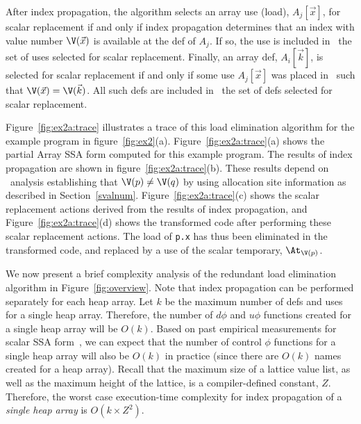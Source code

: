 
After index propagation, the algorithm selects an array use (load),
$A_j[\vec{x}]$, for scalar replacement if and only if index propagation
determines that an index with value number $\V(\vec{x})$ is available at the 
def of $A_j$.
If so, the use is included in  \URS\, the set of uses selected
for scalar replacement.
Finally, an array def, $A_i[\vec{k}]$, is selected for
scalar replacement if and only if some use $A_j[\vec{x}]$ was placed in \URS\ such
that  $\V(\vec{x})=\V(\vec{k})$.  
All such defs are included in \DRS\, the set of defs selected for scalar
replacement.



Figure~\ref{fig:ex2a:trace} illustrates a trace of this load
elimination algorithm for the example program in
figure~\ref{fig:ex2}(a).  Figure~\ref{fig:ex2a:trace}(a) shows the
partial Array SSA form computed for this example program.  The results
of index propagation are shown in figure~\ref{fig:ex2a:trace}(b).
These results depend on \dd\ analysis establishing that $\V(p) \not=
\V(q)$ by using allocation site information as described in
Section~\ref{svalnum}.
Figure~\ref{fig:ex2a:trace}(c) shows the scalar replacement actions
derived from the results of index propagation, and
Figure~\ref{fig:ex2a:trace}(d) shows the transformed code after
performing these scalar replacement actions.  The load of {\tt p.x}
has thus
been eliminated in the transformed code, and replaced by a use
of the scalar temporary, $\At_{\V(p)}$.

We now present a brief complexity analysis of the
redundant load elimination algorithm in Figure~\ref{fig:overview}.
Note that index propagation can be performed separately for each heap
array.  Let $k$ be the maximum number of defs and uses for a single
heap array.  Therefore, the number of $d\phi$ and $u\phi$ functions
created for a single heap array will be $O(k)$.  Based on past
empirical measurements for scalar SSA form~\cite{CFRWZ91a}, we can
expect that the number of control $\phi$ functions for a single heap
array will also be $O(k)$ in practice (since there are $O(k)$ names
created for a heap array).  Recall that the maximum size of
a lattice value list, as well as the maximum height of the lattice, is
a compiler-defined constant, $Z$.  Therefore, the worst case
execution-time complexity for index propagation of a {\it single heap
array} is $O(k \times Z^2)$.

